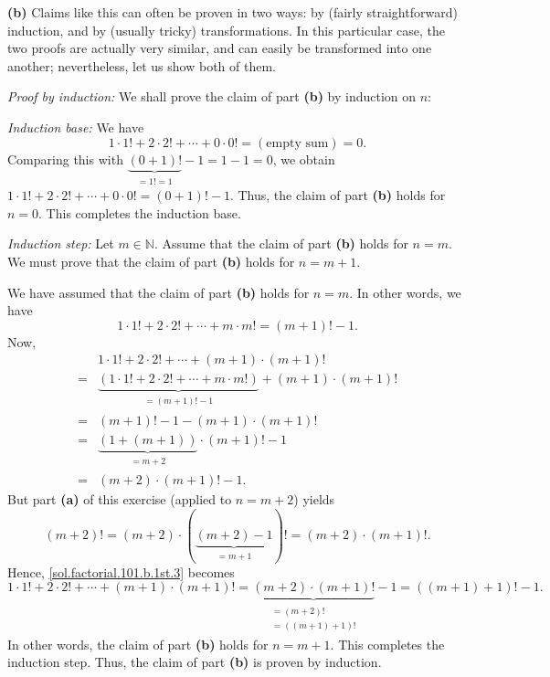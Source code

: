 \documentclass[paper=a4, fontsize=12pt]{scrartcl} %
\newcommand{\NN}{\mathbb{N}} %
\newcommand{\tup}[1]{\left( #1 \right)}
\newcommand{\underbrack}[2]{\underbrace{#1}_{\substack{#2}}}
\theoremstyle{plainsl}
\theoremstyle{definition}
\theoremstyle{remark}
\begin{document}
\vspace{0.8pc}

\textbf{(b)}
Claims like this can often be proven in two ways:
by (fairly straightforward) induction,
and by (usually tricky) transformations.
In this particular case, the two proofs are actually very
similar, and can easily be transformed into one another;
nevertheless, let us show both of them.

\textit{Proof by induction:} We shall prove the claim of part \textbf{(b)}
by induction on $n$:

\textit{Induction base:} We have
\[
1\cdot 1! + 2\cdot 2! + \cdots + 0\cdot 0!
= \tup{\text{empty sum}} = 0.
\]
Comparing this with $\underbrack{\tup{0+1}!}{=1!=1} - 1 = 1-1 = 0$, we
obtain $1\cdot 1! + 2\cdot 2! + \cdots + 0\cdot 0! = \tup{0+1}! - 1$. Thus,
the claim of part \textbf{(b)} holds for $n = 0$.
This completes the induction base.

\textit{Induction step:} Let $m \in \NN$.
Assume that the claim of part \textbf{(b)} holds for $n = m$.
We must prove that the claim of part \textbf{(b)} holds for $n = m+1$.

We have assumed that the claim of part \textbf{(b)} holds for $n = m$.
In other words, we have
\[
1\cdot 1! + 2\cdot 2! + \cdots + m\cdot m! = \tup{m+1}! - 1.
\]
Now,
\begin{align}
  & 1\cdot 1! + 2\cdot 2! + \cdots + \tup{m+1}\cdot \tup{m+1}!
    \nonumber \\
= & \underbrack{\tup{ 1\cdot 1! + 2\cdot 2! + \cdots + m\cdot m! } }{= \tup{m+1}! - 1}
     + \tup{m+1} \cdot \tup{m+1}!  \nonumber \\
= & \tup{m+1}! - 1 - \tup{m+1} \cdot \tup{m+1}!  \nonumber \\
= & \underbrack{\tup{1 + \tup{m+1}}}{= m+2} \cdot \tup{m+1}! - 1
    \nonumber \\
= & \tup{m+2} \cdot \tup{m+1}! - 1.
\label{sol.factorial.101.b.1st.3}
\end{align}
But part \textbf{(a)} of this exercise (applied to $n = m+2$) yields
\[
\tup{m+2}!
= \tup{m+2} \cdot \tup{ \underbrack{ \tup{m+2}-1 }{= m+1} }!
= \tup{m+2} \cdot \tup{m+1}!.
\]
Hence, \eqref{sol.factorial.101.b.1st.3} becomes
\[
1\cdot 1! + 2\cdot 2! + \cdots + \tup{m+1}\cdot \tup{m+1}!
= \underbrack{\tup{m+2} \cdot \tup{m+1}!}{\substack{ = \tup{m+2}! \\
                        = \tup{ \tup{m+1}+1 } !}}
  - 1
= \tup{ \tup{m+1} + 1 }! - 1 .
\]
In other words, the claim of part \textbf{(b)} holds for $n = m+1$.
This completes the induction step.
Thus, the claim of part \textbf{(b)} is proven by induction.
\end{document}
